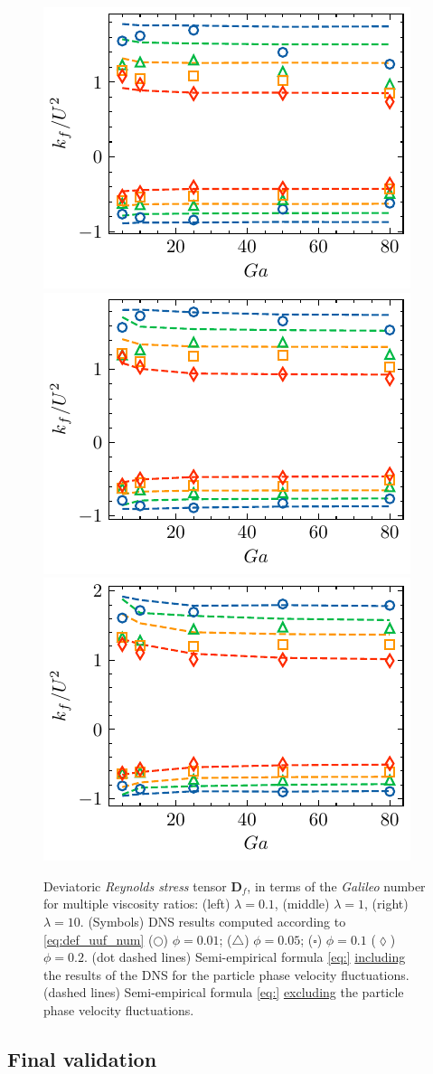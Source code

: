 \begin{figure}
    \centering
    \includegraphics[height = 0.25\textwidth]{image/HOMOGENEOUS_final/CA/D2_l_0.pdf}
    \includegraphics[height = 0.25\textwidth]{image/HOMOGENEOUS_final/CA/D2_l_1.pdf}
    \includegraphics[height = 0.25\textwidth]{image/HOMOGENEOUS_final/CA/D2_l_10.pdf}
    \caption{Deviatoric \textit{Reynolds stress} tensor $\textbf{D}_f$, in terms of the \textit{Galileo} number for multiple viscosity ratios:
    (left) $\lambda = 0.1$,
    (middle) $\lambda = 1$,
    (right) $\lambda = 10$. 
    (Symbols) DNS results computed according to \ref{eq:def_uuf_num}
    ($\pmb\bigcirc$) $\phi = 0.01$; ($\pmb\triangle$) $ \phi = 0.05$; ($\pmb\square$) $\phi = 0.1$ ($\pmb\lozenge$) $\phi = 0.2$.
    (dot dashed lines) Semi-empirical formula \ref{eq:} \underline{including} the results of the DNS for the particle phase velocity fluctuations. 
    (dashed lines) Semi-empirical formula \ref{eq:} \underline{excluding} the particle phase velocity fluctuations. 
    }
    \label{fig:kf}
\end{figure}







\subsection{Final validation}


